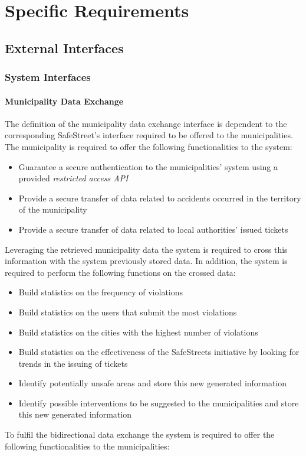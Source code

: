 \setlength{\parindent}{4ex}
\setlength{\parskip}{1ex}

\section{Specific Requirements}

\subsection{External Interfaces}

\subsubsection{System Interfaces}

\paragraph{Municipality Data Exchange} \label{p:mde} The definition of the municipality data exchange interface is dependent to the corresponding SafeStreet's interface required to be offered to the municipalities. The municipality is required to offer the following functionalities to the system:

	\begin{itemize}
		\item Guarantee a secure authentication to the municipalities' system using a provided \emph{restricted access API}
		\item Provide a secure transfer of data related to accidents occurred in the territory of the municipality
		\item Provide a secure transfer of data related to local authorities' issued tickets 
	\end{itemize} 
Leveraging the retrieved municipality data the system is required to cross this information with the system previously stored data. In addition, the system is required to perform the following functions on the crossed data:
	
	\begin{itemize}
		\item Build statistics on the frequency of violations
		\item Build statistics on the users that submit the most violations
		\item Build statistics on the cities with the highest number of violations
		\item Build statistics on the effectiveness of the SafeStreets initiative by looking for trends in the issuing of tickets
		\item Identify potentially unsafe areas and store this new generated information 
		\item Identify possible interventions to be suggested to the municipalities and store this new generated information 
	\end{itemize}
To fulfil the bidirectional data exchange the system is required to offer the following functionalities to the municipalities:
	
